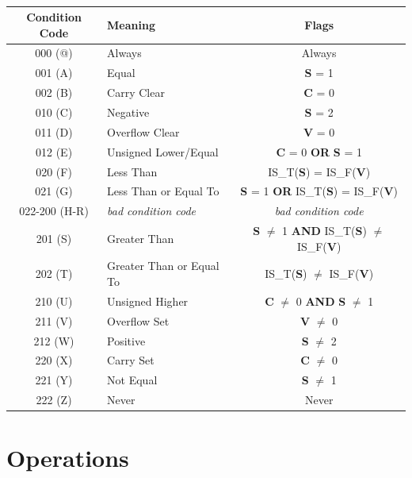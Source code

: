 \documentclass[12pt]{article}
\begin{document}
\begin{table}[h!]
    \centering
    \caption{}
    \label{tab:Conditions}
    \begin{tabular}{|c|l|c|} 
        \hline
        \textbf{Condition Code} & Meaning & Flags \\ \hline
        
        000 (@) & Always & Always \\ \hline
        001 (A) & Equal & \textbf{S} = 1 \\ \hline
        002 (B) & Carry Clear & \textbf{C} = 0 \\ \hline
        010 (C) & Negative & \textbf{S} = 2 \\ \hline
        011 (D) & Overflow Clear & \textbf{V} = 0 \\ \hline
        012 (E) & Unsigned Lower/Equal & \textbf{C} = 0 \textbf{OR} \textbf{S} = 1 \\ \hline
        020 (F) & Less Than & IS\_T(\textbf{S}) = IS\_F(\textbf{V}) \\ \hline
        021 (G) & Less Than or Equal To & \textbf{S} = 1 \textbf{OR} IS\_T(\textbf{S}) = IS\_F(\textbf{V}) \\ \hline
    
        022-200 (H-R) & \textit{bad condition code} & \textit{bad condition code} \\ \hline
    
        201 (S) & Greater Than & \textbf{S} $\neq$ 1 \textbf{AND} IS\_T(\textbf{S}) $\neq$ IS\_F(\textbf{V}) \\ \hline
        202 (T) & Greater Than or Equal To & IS\_T(\textbf{S}) $\neq$ IS\_F(\textbf{V}) \\ \hline
        210 (U) & Unsigned Higher & \textbf{C} $\neq$ 0 \textbf{AND} \textbf{S} $\neq$ 1 \\ \hline
        211 (V) & Overflow Set & \textbf{V} $\neq$ 0 \\ \hline
        212 (W) & Positive & \textbf{S} $\neq$ 2 \\ \hline
        220 (X) & Carry Set & \textbf{C} $\neq$ 0 \\ \hline
        221 (Y) & Not Equal & \textbf{S} $\neq$ 1 \\ \hline
        222 (Z) & Never & Never \\ \hline
    \end{tabular}
\end{table}

\section{Operations} \label{sec:Operations}
\end{document}

